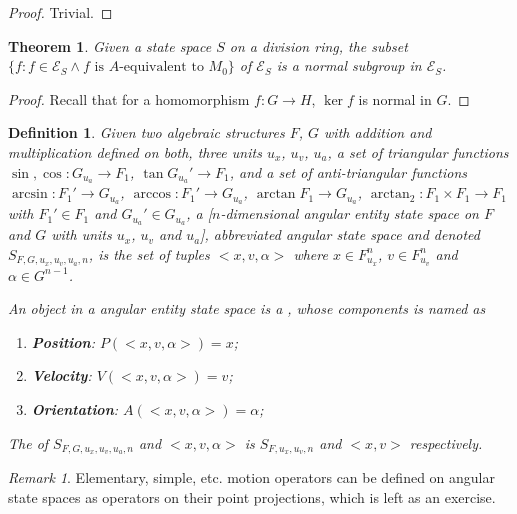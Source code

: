 \documentclass{book}
\newtheorem{definition}{Definition}
\newtheorem{theorem}{Theorem}
\theoremstyle{definition}\newtheorem{mechanism}{Mechanism}
\theoremstyle{remark}\newtheorem*{remark}{Remark}
\begin{document}
\begin{proof}
	Trivial.
\end{proof}

\begin{theorem}
	Given a state space $S$ on a division ring, the subset $\{f: f\in \mathcal{E}_S \land f \text{ is }A\text{-equivalent to } M_0\}$ of $\mathcal{E}_S$ is a normal subgroup in $\mathcal{E}_S$.
\end{theorem}

\begin{proof}
	Recall that for a homomorphism $f: G \to H$, $\ker f$ is normal in $G$.
\end{proof}

\begin{definition}
	Given two algebraic structures $F$, $G$ with addition and multiplication defined on both, three units $u_x$, $u_v$, $u_a$, a set of triangular functions $\sin, \cos: G_{u_a}\to F_1$, $\tan G_{u_a}'\to F_1$, and a set of anti-triangular functions $\arcsin: F_1'\to G_{u_a}$, $\arccos: F_1'\to G_{u_a}$, $\arctan F_1\to G_{u_a}$, $\arctan_2: F_1\times F_1 \to F_1$ with $F_1'\in F_1$ and $G_{u_a}'\in G_{u_a}$, a [$n$-dimensional angular entity state space on $F$ and $G$ with units $u_x$, $u_v$ and $u_a$], abbreviated angular state space and denoted $S_{F, G, u_x, u_v, u_a, n}$, is the set of tuples $<x, v, \alpha>$ where $x \in F_{u_x}^n$, $v\in F_{u_v}^n$ and $\alpha \in G^{n - 1}$.
	
	An object in a angular entity state space is a , whose components is named as

	\begin{enumerate}
		\item {\bf{Position}}: $P(<x, v, \alpha>) = x$;
		\item {\bf{Velocity}}: $V(<x, v, \alpha>) = v$;
		\item {\bf{Orientation}}: $A(<x, v, \alpha>) = \alpha$;
	\end{enumerate}
	
	The  of $S_{F, G, u_x, u_v, u_a, n}$ and $<x, v, \alpha>$ is $S_{F, u_x, u_v, n}$ and $<x, v>$ respectively.
\end{definition}

\begin{remark}
	Elementary, simple, etc. motion operators can be defined on angular state spaces as operators on their point projections, which is left as an exercise.
\end{remark}
\end{document}
